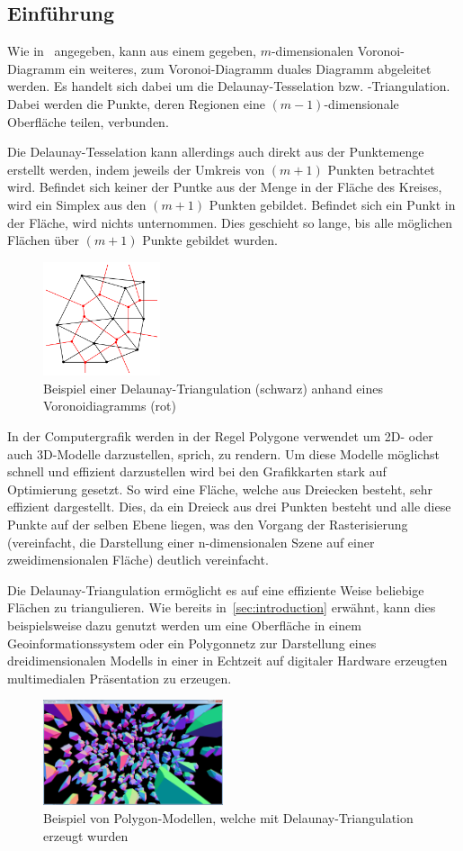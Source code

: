 \subsection{Einführung}
\label{subsec:delaunay-introduction}

Wie in~\cite{atsuyuki2000spatialtessellations} angegeben, kann aus einem gegeben, $m$-dimensionalen Voronoi-Diagramm ein weiteres, zum Voronoi-Diagramm duales Diagramm abgeleitet werden. Es handelt sich dabei um die Delaunay-Tesselation bzw. -Triangulation. Dabei werden die Punkte, deren Regionen eine $(m-1)$-dimensionale Oberfläche teilen, verbunden.

Die Delaunay-Tesselation kann allerdings auch direkt aus der Punktemenge erstellt werden, indem jeweils der Umkreis von $(m+1)$ Punkten betrachtet wird. Befindet sich keiner der Puntke aus der Menge in der Fläche des Kreises, wird ein Simplex aus den $(m+1)$ Punkten gebildet. Befindet sich ein Punkt in der Fläche, wird nichts unternommen. Dies geschieht so lange, bis alle möglichen Flächen über $(m+1)$ Punkte gebildet wurden.

\begin{figure}[h]
\centering
\includegraphics[width=130px]{images/voronoi_delaunay_example_01.png}
\caption{Beispiel einer Delaunay-Triangulation (schwarz) anhand eines Voronoidiagramms (rot)}
\label{fig:delaunayVoronoiExample}
\end{figure}


In der Computergrafik werden in der Regel Polygone verwendet um 2D- oder auch 3D-Modelle darzustellen, sprich, zu rendern. Um diese Modelle möglichst schnell und effizient darzustellen wird bei den Grafikkarten stark auf Optimierung gesetzt. So wird eine Fläche, welche aus Dreiecken besteht, sehr effizient dargestellt. Dies, da ein Dreieck aus drei Punkten besteht und alle diese Punkte auf der selben Ebene liegen, was den Vorgang der Rasterisierung (vereinfacht, die Darstellung einer n-dimensionalen Szene auf einer zweidimensionalen Fläche) deutlich vereinfacht.

Die Delaunay-Triangulation ermöglicht es auf eine effiziente Weise beliebige Flächen zu triangulieren. Wie bereits in~\ref{sec:introduction} erwähnt, kann dies beispielsweise dazu genutzt werden um eine Oberfläche in einem Geoinformationssystem oder ein Polygonnetz zur Darstellung eines dreidimensionalen Modells in einer in Echtzeit auf digitaler Hardware erzeugten multimedialen Präsentation zu erzeugen.

\begin{figure}[h]
\centering
\includegraphics[width=200px]{images/voronoi_delaunay_example_02.png}
\caption[width=100px]{Beispiel von Polygon-Modellen, welche mit Delaunay-Triangulation erzeugt wurden}
\label{fig:delaunayVoronoiExample2}
\end{figure}

